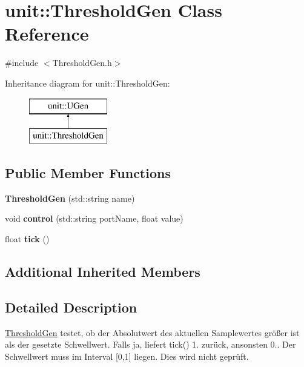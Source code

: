\hypertarget{classunit_1_1ThresholdGen}{}\section{unit\+:\+:Threshold\+Gen Class Reference}
\label{classunit_1_1ThresholdGen}


{\ttfamily \#include $<$Threshold\+Gen.\+h$>$}

Inheritance diagram for unit\+:\+:Threshold\+Gen\+:\begin{figure}[H]
\begin{center}
\leavevmode
\includegraphics[height=2.000000cm]{classunit_1_1ThresholdGen}
\end{center}
\end{figure}
\subsection*{Public Member Functions}
\begin{DoxyCompactItemize}
\item 
{\bfseries Threshold\+Gen} (std\+::string name)\hypertarget{classunit_1_1ThresholdGen_ac4b7861be1523284fbd1158afa6da231}{}\label{classunit_1_1ThresholdGen_ac4b7861be1523284fbd1158afa6da231}

\item 
void {\bfseries control} (std\+::string port\+Name, float value)\hypertarget{classunit_1_1ThresholdGen_aafd3ea65bfc964598119efd3988068ee}{}\label{classunit_1_1ThresholdGen_aafd3ea65bfc964598119efd3988068ee}

\item 
float {\bfseries tick} ()\hypertarget{classunit_1_1ThresholdGen_a422ab3288c91db592849ca1328a6ee6b}{}\label{classunit_1_1ThresholdGen_a422ab3288c91db592849ca1328a6ee6b}

\end{DoxyCompactItemize}
\subsection*{Additional Inherited Members}


\subsection{Detailed Description}
\hyperlink{classunit_1_1ThresholdGen}{Threshold\+Gen} testet, ob der Absolutwert des aktuellen Samplewertes größer ist als der gesetzte Schwellwert. Falls ja, liefert tick() 1. zurück, ansonsten 0.. Der Schwellwert muss im Interval \mbox{[}0,1\mbox{]} liegen. Dies wird nicht geprüft.


